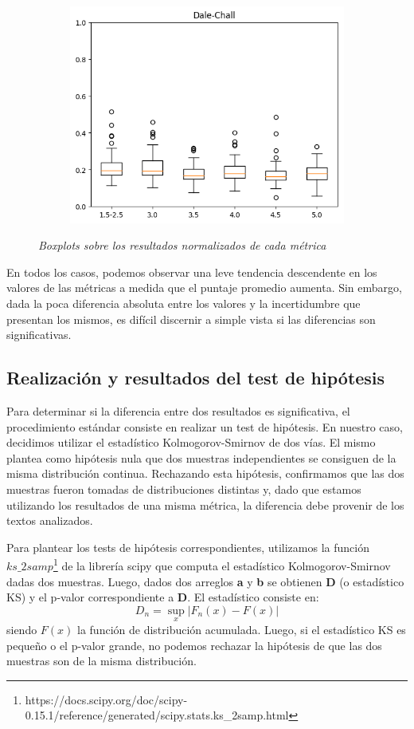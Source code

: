 \documentclass[12pt,journal,compsoc]{IEEEtran}
\begin{document}
\begin{figure}[H]
\begin{subfigure}{0.27\textwidth}
\includegraphics[scale=0.41]{../unigrams/scripts/boxplots/Dale-Chall.png}
\end{subfigure}
\caption{\small \textit{Boxplots sobre los resultados normalizados de cada métrica}}
\label{fig:boxplots}
\end{figure}

En todos los casos, podemos observar una leve tendencia descendente en los valores de las métricas a medida que el puntaje promedio aumenta. Sin embargo, dada la poca diferencia absoluta entre los valores y la incertidumbre que presentan los mismos, es difícil discernir a simple vista si las diferencias son significativas.

\subsection{Realización y resultados del test de hipótesis}

Para determinar si la diferencia entre dos resultados es significativa, el procedimiento estándar consiste en realizar un test de hipótesis. En nuestro caso, decidimos utilizar el estadístico Kolmogorov-Smirnov de dos vías. El mismo plantea como hipótesis nula que dos muestras independientes se consiguen de la misma distribución continua. Rechazando esta hipótesis, confirmamos que las dos muestras fueron tomadas de distribuciones distintas y, dado que estamos utilizando los resultados de una misma métrica, la diferencia debe provenir de los textos analizados.

Para plantear los tests de hipótesis correspondientes, utilizamos la función $ks\_2samp$\footnote{https://docs.scipy.org/doc/scipy-0.15.1/reference/generated/scipy.stats.ks\_2samp.html} de la librería scipy que computa el estadístico Kolmogorov-Smirnov dadas dos muestras. Luego, dados dos arreglos \textbf{a} y \textbf{b} se obtienen \textbf{D} (o estadístico KS) y el p-valor correspondiente a \textbf{D}. El estadístico consiste en:
$$D_{n}=\sup_{x}|F_{n}(x)-F(x)|$$
siendo $F(x)$ la función de distribución acumulada. Luego, si el estadístico KS es pequeño o el p-valor grande, no podemos rechazar la hipótesis de que las dos muestras son de la misma distribución\cite{degroot}.\\
\end{document}
